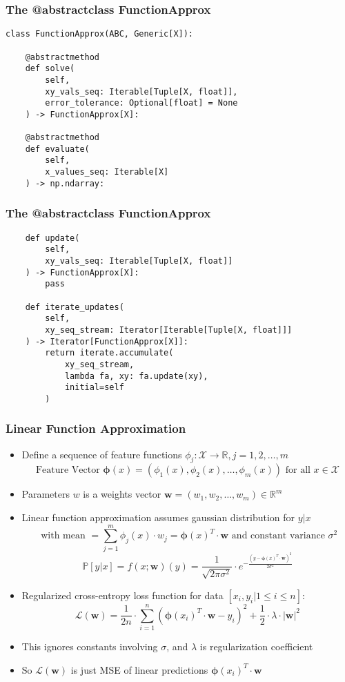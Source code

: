 \documentclass[handout]{beamer}
\begin{document}
\begin{frame}[fragile]
\frametitle{The @abstractclass FunctionApprox}
\pause
\begin{lstlisting}
class FunctionApprox(ABC, Generic[X]):

    @abstractmethod
    def solve(
        self,
        xy_vals_seq: Iterable[Tuple[X, float]],
        error_tolerance: Optional[float] = None
    ) -> FunctionApprox[X]:
    
    @abstractmethod
    def evaluate(
        self,
        x_values_seq: Iterable[X]
    ) -> np.ndarray:
\end{lstlisting}
\end{frame}

\begin{frame}[fragile]
\frametitle{The @abstractclass FunctionApprox}
\pause
\begin{lstlisting}
    def update(
        self,
        xy_vals_seq: Iterable[Tuple[X, float]]
    ) -> FunctionApprox[X]:
        pass
        
    def iterate_updates(
        self,
        xy_seq_stream: Iterator[Iterable[Tuple[X, float]]]
    ) -> Iterator[FunctionApprox[X]]:
        return iterate.accumulate(
            xy_seq_stream,
            lambda fa, xy: fa.update(xy),
            initial=self
        )   
\end{lstlisting}
\end{frame}


\begin{frame}
\frametitle{Linear Function Approximation}
\pause
\begin{itemize}[<+->]
\item Define a sequence of feature functions $\phi_j: \mathcal{X} \rightarrow \mathbb{R}, j = 1, 2, \ldots, m$
$$\mbox{Feature Vector } \bm{\phi}(x) = (\phi_1(x), \phi_2(x), \ldots, \phi_m(x)) \text{ for all } x \in \mathcal{X}$$
\item Parameters $w$ is a weights vector $\bm{w} = (w_1, w_2, \ldots, w_m) \in \mathbb{R}^m$
\item Linear function approximation assumes gaussian distribution for $y|x$
$$\text{ with mean } = \sum_{j=1}^m \phi_j(x) \cdot w_j = \bm{\phi}(x)^T \cdot \bm{w} \text{ and constant variance } \sigma^2$$
$$\mathbb{P}[y|x] = f(x;\bm{w})(y) = \frac {1} {\sqrt{2\pi \sigma^2}} \cdot e^{-\frac {(y - \bm{\phi}(x)^T \cdot \bm{w})^2} {2\sigma^2}}$$
\item Regularized cross-entropy loss function for data $[x_i, y_i|1 \leq i \leq n]$:
$$\mathcal{L}(\bm{w}) = \frac 1 {2n} \cdot \sum_{i=1}^n (\bm{\phi}(x_i)^T \cdot \bm{w} - y_i)^2 + \frac 1 2 \cdot\lambda \cdot |\bm{w}|^2$$
\item This ignores constants involving $\sigma$, and $\lambda$ is regularization coefficient
\item So $\mathcal{L}(\bm{w})$ is just MSE of linear predictions $\bm{\phi}(x_i)^T \cdot \bm{w}$
\end{itemize}
\end{frame}
\end{document}
